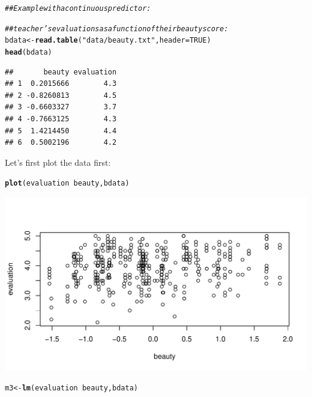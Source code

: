 \documentclass[12pt]{book}\usepackage[]{graphicx}\usepackage[]{color}
\makeatletter
\def\maxwidth{ %
  \ifdim\Gin@nat@width>\linewidth
    \linewidth
  \else
    \Gin@nat@width
  \fi
}
\newcommand{\hlnum}[1]{\textcolor[rgb]{0.686,0.059,0.569}{#1}}%
\newcommand{\hlstr}[1]{\textcolor[rgb]{0.192,0.494,0.8}{#1}}%
\newcommand{\hlcom}[1]{\textcolor[rgb]{0.678,0.584,0.686}{\textit{#1}}}%
\newcommand{\hlopt}[1]{\textcolor[rgb]{0,0,0}{#1}}%
\newcommand{\hlstd}[1]{\textcolor[rgb]{0.345,0.345,0.345}{#1}}%
\newcommand{\hlkwb}[1]{\textcolor[rgb]{0.69,0.353,0.396}{#1}}%
\newcommand{\hlkwc}[1]{\textcolor[rgb]{0.333,0.667,0.333}{#1}}%
\newcommand{\hlkwd}[1]{\textcolor[rgb]{0.737,0.353,0.396}{\textbf{#1}}}%
\newenvironment{kframe}{%
 \def\at@end@of@kframe{}%
 \ifinner\ifhmode%
  \def\at@end@of@kframe{\end{minipage}}%
  \begin{minipage}{\columnwidth}%
 \fi\fi%
 \def\FrameCommand##1{\hskip\@totalleftmargin \hskip-\fboxsep
 \colorbox{shadecolor}{##1}\hskip-\fboxsep
     \hskip-\linewidth \hskip-\@totalleftmargin \hskip\columnwidth}%
 \MakeFramed {\advance\hsize-\width
   \@totalleftmargin\z@ \linewidth\hsize
   \@setminipage}}%
 {\par\unskip\endMakeFramed%
 \at@end@of@kframe}
\newenvironment{knitrout}{}{} %
\makeatother
\begin{document}
\begin{knitrout}
\color{fgcolor}\begin{kframe}
\begin{alltt}
\hlcom{## Example with a continuous predictor:}

\hlcom{## teacher's evaluations as a function of their beauty score:}
\hlstd{bdata} \hlkwb{<-} \hlkwd{read.table}\hlstd{(}\hlstr{"data/beauty.txt"}\hlstd{,}\hlkwc{header}\hlstd{=}\hlnum{TRUE}\hlstd{)}
\hlkwd{head}\hlstd{(bdata)}
\end{alltt}
\begin{verbatim}
##       beauty evaluation
## 1  0.2015666        4.3
## 2 -0.8260813        4.5
## 3 -0.6603327        3.7
## 4 -0.7663125        4.3
## 5  1.4214450        4.4
## 6  0.5002196        4.2
\end{verbatim}
\end{kframe}
\end{knitrout}

Let's first plot the data first:

\begin{knitrout}
\color{fgcolor}\begin{kframe}
\begin{alltt}
\hlkwd{plot}\hlstd{(evaluation}\hlopt{~}\hlstd{beauty,bdata)}
\end{alltt}
\end{kframe}
\includegraphics[width=\maxwidth]{figure/unnamed-chunk-109-1} 

\end{knitrout}


\begin{knitrout}
\color{fgcolor}\begin{kframe}
\begin{alltt}
\hlstd{m3}\hlkwb{<-}\hlkwd{lm}\hlstd{(evaluation}\hlopt{~}\hlstd{beauty,bdata)}
\end{alltt}
\end{kframe}
\end{knitrout}
\end{document}
